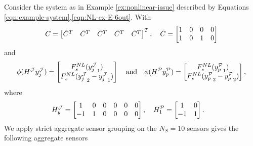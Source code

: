 \begin{example}\label{ex:strict-aggregate}
    Consider the system as in Example \ref{ex:nonlinear-issue} described by Equations \eqref{eqn:example-system},\eqref{eqn:NL-ex-E-6out}. With 
    \begin{equation*}
        C =
        \begin{bmatrix}
            \Tilde{C}^{T} &
            \Tilde{C}^{T} &
            \Tilde{C}^{T} &
            \Tilde{C}^{T} &
            \Tilde{C}^{T} 
        \end{bmatrix}^{T}, \quad
        \Tilde{C} = 
        \begin{bmatrix}
            1 & 0 & 0 & 0 \\
            1 & 0 & 1 & 0 \\
        \end{bmatrix}
    \end{equation*}
    and 
    \begin{equation*}
        \phi(H^{\mathcal{J}}y^{\mathcal{J}}_j) =
        \begin{bmatrix}
            F^{NL}_s({y^{\mathcal{J}}_j}_{1}) \\
            F^{NL}_s({y^{\mathcal{J}}_j}_{2} - {y^{\mathcal{J}}_j}_1)
        \end{bmatrix} 
        \quad \text{and} \quad
        \phi(H^{\mathcal{P}}y^{\mathcal{P}}_p) =
        \begin{bmatrix}
            F^{NL}_s({y^{\mathcal{P}}_p}_{1}) \\
            F^{NL}_s({y^{\mathcal{P}}_p}_{2} - {y^{\mathcal{P}}_p}_{2})
        \end{bmatrix},
    \end{equation*}
    where
    \begin{equation*}
        \begin{split}
            H^{\mathcal{J}}_y &=
            \begin{bmatrix}
                1 & 0 & 0 & 0 & 0 & 0 \\
                -1 & 1 & 0 & 0 & 0 & 0 \\
            \end{bmatrix}, \quad 
            H^{\mathcal{P}}_1 =
            \begin{bmatrix}
                1 & 0 \\
                -1 & 1 \\
            \end{bmatrix}.
        \end{split}
    \end{equation*}
    We apply strict aggregate sensor grouping on the $N_S=10$ sensors gives the following aggregate sensors

\end{example}
